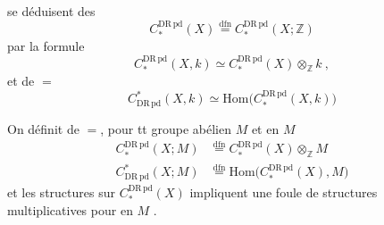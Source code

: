 se déduisent des
\[
 C_*^{\mathrm{DR\,pd}}(X)\mathrel{\overset{\mathrm{dfn}}{=}}C_*^{\mathrm{DR\,pd}}(X;\mathbb Z)
\]
par la formule
\[
 C_*^{\mathrm{DR\,pd}}(X,k)\simeq C_*^{\mathrm{DR\,pd}}(X)\otimes_{\mathbb Z}k\ ,
\]
et  de $=$
\[
 C_{\mathrm{DR\,pd}}^*(X,k)\simeq\mathrm{Hom}\bigl(C_*^{\mathrm{DR\,pd}}(X,k)\bigr)
\]

On définit de $=$, pour tt groupe abélien $M$ et  en $M$
\[
\begin{aligned}
 C_*^{\mathrm{DR\,pd}}(X;M)&\mathrel{\overset{\mathrm{dfn}}{=}}C_*^{\mathrm{DR\,pd}}(X)\otimes_{\mathbb Z} M\\
 C_{\mathrm{DR\,pd}}^*(X;M)&\mathrel{\overset{\mathrm{dfn}}{=}}\mathrm{Hom}\bigl(C_*^{\mathrm{DR\,pd}}(X),M\bigr)
\end{aligned}
\]
et les structures sur $C_*^{\mathrm{DR\,pd}}(X)$ impliquent une foule de structures multiplicatives pour  en $M$ \unsure{\ldots}.
